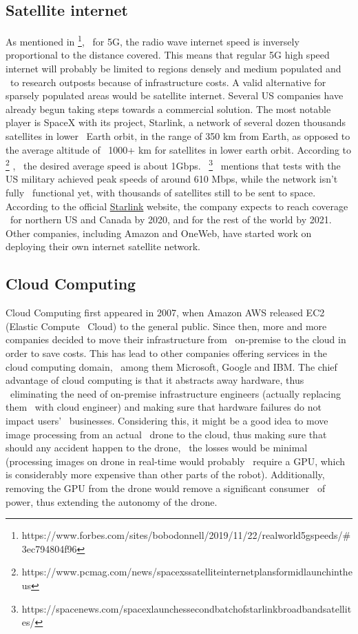 \subsection{Satellite internet}
\label{subsec:satellite-internet}
As mentioned in \footnote{https://www.forbes.com/sites/bobodonnell/2019/11/22/real\-world\-5g\-speeds/\#3ec794804f96}, \
for 5G, the radio wave internet speed is inversely proportional to the distance covered.
This means that regular 5G high speed internet will probably be limited to regions densely and medium populated and \
to research outposts because of infrastructure costs.
A valid alternative for sparsely populated areas would be satellite internet.
Several US companies have already begun taking steps towards a commercial solution.
The most notable player is SpaceX with its project, Starlink, a network of several dozen thousands satellites in lower \
Earth orbit, in the range of 350 km from Earth, as opposed to the average altitude of \
1000+ km for satellites in lower earth orbit.
According to \footnote{https://www.pcmag.com/news/spacexs\-satellite\-internet\-plans\-for\-mid\-launch\-in\-the\-us} , \
the desired average speed is about 1Gbps. \
 \footnote{https://spacenews.com/spacex\-launches\-second\-batch\-of\-starlink\-broadband\-satellites/} \
mentions that tests with the US military achieved peak speeds of around 610 Mbps, while the network isn't fully \
functional yet, with thousands of satellites still to be sent to space.
According to the official \href{https://www.starlink.com/}{Starlink} website, the company expects to reach coverage \
for northern US and Canada by 2020, and for the rest of the world by 2021.
Other companies, including Amazon and OneWeb, have started work on deploying their own internet satellite network.

\subsection{Cloud Computing}
\label{subsec:cloud-computing}
Cloud Computing first appeared in 2007, when Amazon AWS released EC2 (Elastic Compute \
Cloud) to the general public.
Since then, more and more companies decided to move their infrastructure from \
on-premise to the cloud in order to save costs.
This has lead to other companies offering services in the cloud computing domain, \
among them Microsoft, Google and IBM.
The chief advantage of cloud computing is that it abstracts away hardware, thus \
eliminating the need of on-premise infrastructure engineers (actually replacing them \
with cloud engineer) and making sure that hardware failures do not impact users' \
businesses.
Considering this, it might be a good idea to move image processing from an actual \
drone to the cloud, thus making sure that should any accident happen to the drone, \
the losses would be minimal (processing images on drone in real-time would probably \
require a GPU, which is considerably more expensive than other parts of the robot).
Additionally, removing the GPU from the drone would remove a significant consumer \
of power, thus extending the autonomy of the drone.

